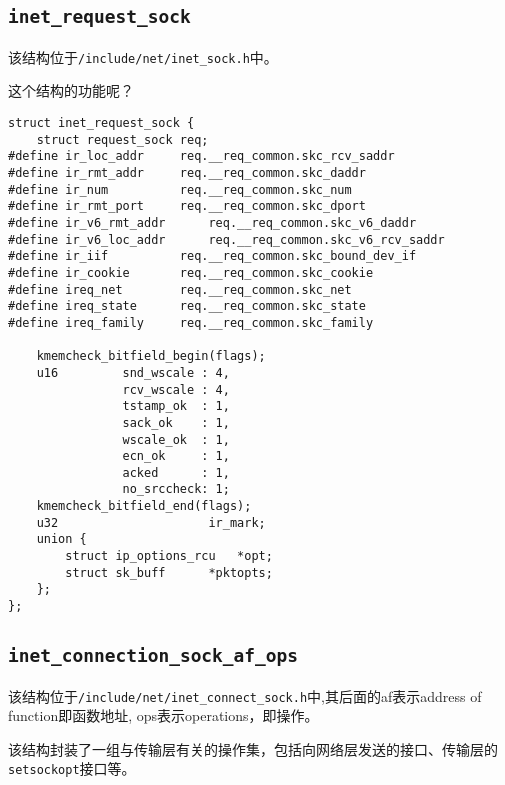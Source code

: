         \subsection{\texttt{inet_request_sock}}

        该结构位于\texttt{/include/net/inet_sock.h}中。

        这个结构的功能呢？

\begin{verbatim}
struct inet_request_sock {
    struct request_sock req;
#define ir_loc_addr     req.__req_common.skc_rcv_saddr
#define ir_rmt_addr     req.__req_common.skc_daddr
#define ir_num          req.__req_common.skc_num
#define ir_rmt_port     req.__req_common.skc_dport
#define ir_v6_rmt_addr      req.__req_common.skc_v6_daddr
#define ir_v6_loc_addr      req.__req_common.skc_v6_rcv_saddr
#define ir_iif          req.__req_common.skc_bound_dev_if
#define ir_cookie       req.__req_common.skc_cookie
#define ireq_net        req.__req_common.skc_net
#define ireq_state      req.__req_common.skc_state
#define ireq_family     req.__req_common.skc_family

    kmemcheck_bitfield_begin(flags);
    u16         snd_wscale : 4,
                rcv_wscale : 4,
                tstamp_ok  : 1,
                sack_ok    : 1,
                wscale_ok  : 1,
                ecn_ok     : 1,
                acked      : 1,
                no_srccheck: 1;
    kmemcheck_bitfield_end(flags);
    u32                     ir_mark;
    union {
        struct ip_options_rcu   *opt;
        struct sk_buff      *pktopts;
    };
};
\end{verbatim}     
        \subsection{\texttt{inet_connection_sock_af_ops}}

            该结构位于\texttt{/include/net/inet_connect_sock.h}中,其后面的af表示address of function即函数地址, ops表示operations，即操作。

            该结构封装了一组与传输层有关的操作集，包括向网络层发送的接口、传输层的\texttt{setsockopt}接口等。

